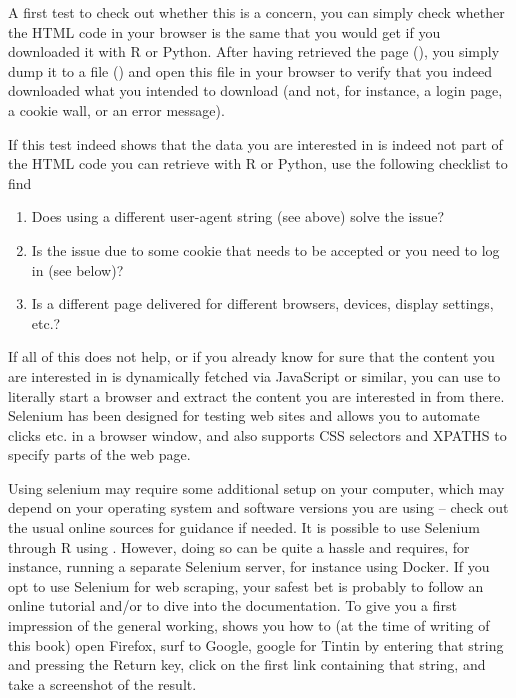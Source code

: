 A first test to check out whether this is a concern, you can simply
check whether the HTML code in your browser is the same that you would
get if you downloaded it with R or Python.  After having retrieved the
page (), you simply dump it to a file
() and open this file in your browser to verify that
you indeed downloaded what you intended to download (and not, for
instance, a login page, a cookie wall, or an error message).



If this test indeed shows that the data you are interested in is
indeed not part of the HTML code you can retrieve with R or Python,
use the following checklist to find

\begin{enumerate}
\item Does using a different user-agent string (see above) solve the issue?
\item Is the issue due to some cookie that needs to be accepted or you need to log in (see below)?
\item Is a different page delivered for different browsers, devices, display settings, etc.?
\end{enumerate}

If all of this does not help, or if you already know for sure that the
content you are interested in is dynamically fetched via JavaScript or
similar, you can use  to literally start a browser and
extract the content you are interested in from there. Selenium has
been designed for testing web sites and allows you to automate clicks
etc. in a browser window, and also supports CSS selectors and XPATHS
to specify parts of the web page.

Using selenium may require some additional setup on your computer,
which may depend on your operating system and software versions you
are using -- check out the usual online sources for guidance if
needed.  It is possible to use Selenium through R using
. However, doing so can be quite a hassle and requires,
for instance, running a separate Selenium server, for instance using
Docker. If you opt to use Selenium for web scraping, your safest bet
is probably to follow an online tutorial and/or to dive into the
documentation. To give you a first impression of the general working,
 shows you how to (at the time of writing of this
book) open Firefox, surf to Google, google for Tintin by entering that
string and pressing the Return key, click on the first link containing
that string, and take a screenshot of the result.

